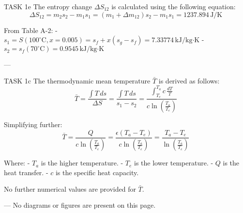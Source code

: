 TASK 1e  
The entropy change \( \Delta S_{12} \) is calculated using the following equation:  
\[
\Delta S_{12} = m_2 s_2 - m_1 s_1 = (m_1 + \Delta m_{12}) s_2 - m_1 s_1 = 1237.894 \, \text{J/K}
\]  

From Table A-2:  
- \( s_1 = S(100^\circ\text{C}, x = 0.005) = s_f + x(s_g - s_f) = 7.33774 \, \text{kJ/kg·K} \)  
- \( s_2 = s_f(70^\circ\text{C}) = 0.9545 \, \text{kJ/kg·K} \)  

---

TASK 1c  
The thermodynamic mean temperature \( \bar{T} \) is derived as follows:  
\[
\bar{T} = \frac{\int T \, ds}{\Delta S} = \frac{\int T \, ds}{s_1 - s_2} = \frac{\int_{T_e}^{T_a} c \, \frac{dT}{T}}{c \ln \left( \frac{T_a}{T_e} \right)}
\]  

Simplifying further:  
\[
\bar{T} = \frac{Q}{c \ln \left( \frac{T_a}{T_e} \right)} = \frac{\epsilon (T_a - T_e)}{c \ln \left( \frac{T_a}{T_e} \right)} = \frac{T_a - T_e}{\ln \left( \frac{T_a}{T_e} \right)}
\]  

Where:  
- \( T_a \) is the higher temperature.  
- \( T_e \) is the lower temperature.  
- \( Q \) is the heat transfer.  
- \( c \) is the specific heat capacity.  

No further numerical values are provided for \( \bar{T} \).  

---  
No diagrams or figures are present on this page.